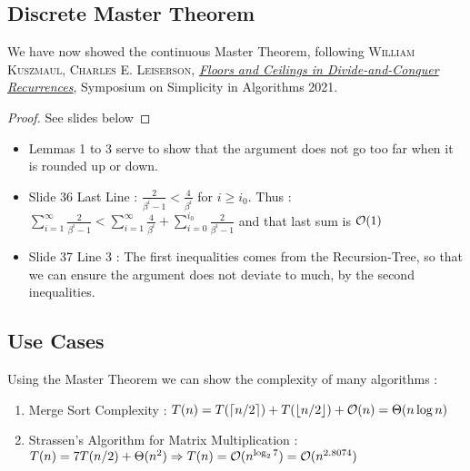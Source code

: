 \documentclass{cours}
\begin{document}
    \subsection{Discrete Master Theorem}
    We have now showed the continuous Master Theorem, following \textsc{William Kuszmaul, Charles E. Leiserson}, \href{https://epubs.siam.org/doi/pdf/10.1137/1.9781611976496.15}{\textit{Floors and Ceilings in Divide-and-Conquer Recurrences}}, Symposium on Simplicity in Algorithms 2021.\\
        \begin{proof}
            See slides below
                
        \end{proof}
        \begin{remark}
            \begin{itemize}
                \item Lemmas 1 to 3 serve to show that the argument does not go too far when it is rounded up or down.
                \item Slide 36 Last Line : $\frac{2}{\beta^{i} - 1} < \frac{4}{\beta^{i}}$ for $i \geq i_{0}$. Thus : $\sum_{i = 1}^{\infty} \frac{2}{\beta^{i} - 1} < \sum_{i = 1}^{\infty}\frac{4}{\beta^{i}} + \sum_{i = 0}^{i_0}\frac{2}{\beta^{i} - 1}$ and that last sum is $\mathcal{O}(1)$
                \item Slide 37 Line 3 : The first inequalities comes from the Recursion-Tree, so that we can ensure the argument does not deviate to much, by the second inequalities. 
            \end{itemize}
        \end{remark}
    \subsection{Use Cases}
    Using the Master Theorem we can show the complexity of many algorithms :
    \begin{enumerate}
        \item Merge Sort Complexity : $T(n) = T(\lceil n/2 \rceil) + T(\lfloor n/2 \rfloor) + \mathcal{O}(n) = \Theta(n\log n)$
        \item Strassen's Algorithm for Matrix Multiplication : $T(n) = 7 T(n/2) + \Theta(n^{2}) \Rightarrow T(n) = \mathcal{O}(n^{\log_{2}7}) = \mathcal{O}(n^{2.8074})$
    \end{enumerate}
\end{document}
